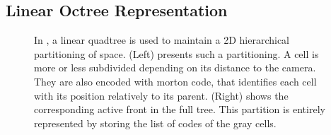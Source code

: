 \documentclass{llncs}
\begin{document}
\subsection{Linear Octree Representation}

\begin{figure}
  \begin{center}
  \end{center}
\caption{In \cite{dupuy2014quadtrees}, a linear quadtree is used to
  maintain a 2D hierarchical partitioning of space.  (Left) presents
  such a partitioning.  A cell is more or less subdivided depending on
  its distance to the camera.  They are also encoded with morton code,
  that identifies each cell with its position relatively to its
  parent.  (Right) shows the corresponding active front in the full
  tree.  This partition is entirely represented by storing the list of
  codes of the gray cells. }
\label{fig_quadtree_partitionning}
\end{figure}
\end{document}
